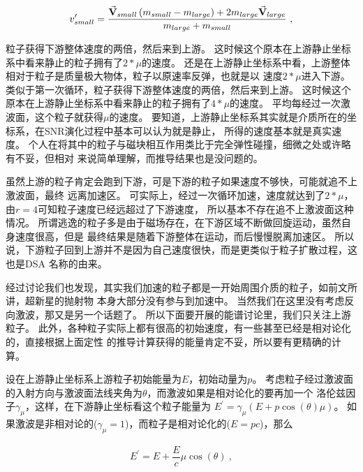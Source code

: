 \begin{equation}
    \begin{aligned}
      v_{small}^{\prime}=\dfrac{\vec{\bold{V}}_{small}\left(m_{small}-m_{large}\right)+2
      m_{large} \vec{\bold{V}}_{large}}{m_{large}+m_{small}}\ ,
    \end{aligned}
\end{equation}

粒子获得下游整体速度的两倍，然后来到上游。
这时候这个原本在上游静止坐标系中看来静止的粒子拥有了$2*\mu$的速度。
还是在上游静止坐标系中看，上游整体相对于粒子是质量极大物体，粒子以原速率反弹，也就是以
速度$2*\mu$进入下游。
类似于第一次循环，粒子获得下游整体速度的两倍，然后来到上游。
这时候这个原本在上游静止坐标系中看来静止的粒子拥有了$4*\mu$的速度。
平均每经过一次激波面，这个粒子就获得$\mu$的速度。
要知道，上游静止坐标系其实就是介质所在的坐标系，在SNR演化过程中基本可以认为就是静止，
所得的速度基本就是真实速度。
个人在将其中的粒子与磁块相互作用类比于完全弹性碰撞，细微之处或许略有不妥，但相对
来说简单理解，而推导结果也是没问题的。

虽然上游的粒子肯定会跑到下游，可是下游的粒子如果速度不够快，可能就追不上激波面，最终
远离加速区。
可实际上，经过一次循环加速，速度就达到了$2*\mu$，由$r=4$可知粒子速度已经远超过了下游速度，
所以基本不存在追不上激波面这种情况。
所谓逃逸的粒子多是由于磁场存在，在下游区域不断做回旋运动，虽然自身速度很高，但是
最终结果是随着下游整体在运动，而后慢慢脱离加速区。
所以说，下游粒子回到上游并不是因为自己速度很快，而是更类似于粒子扩散过程，这也是DSA
名称的由来。

经过讨论我们也发现，其实我们加速的粒子都是一开始周围介质的粒子，如前文所讲，超新星的抛射物
本身大部分没有参与到加速中。
当然我们在这里没有考虑反向激波，那又是另一个话题了。
所以下面要开展的能谱讨论里，我们只关注上游粒子。
此外，各种粒子实际上都有很高的初始速度，有一些甚至已经是相对论化的，直接根据上面定性
的推导计算获得的能量肯定不妥，所以要有更精确的计算。

设在上游静止坐标系上游粒子初始能量为$E$，初始动量为$p$。
考虑粒子经过激波面的入射方向与激波面法线夹角为$\theta$，而激波如果是相对论化的要再加一个
洛伦兹因子$\gamma_\mu$，这样，在下游静止坐标看这个粒子能量为
$E^{\prime}=\gamma_{\mu}(E+p \cos (\theta)\mu )$。
如果激波是非相对论的($\gamma_{\mu}=1$)，而粒子是相对论化的($E=pc$)，那么

\begin{equation}
    \begin{aligned}
      E^{\prime}=E+\dfrac{E}{c} \mu \cos (\theta)\ ,
    \end{aligned}
\end{equation}

